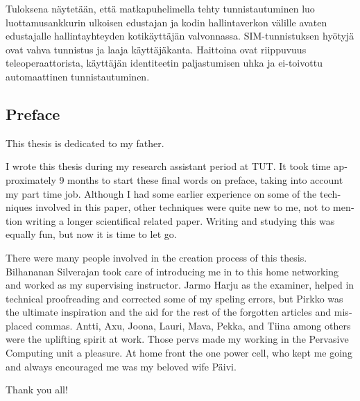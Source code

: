 \documentclass[12pt,a4paper,english]{tutthesis}
\begin{document}
\begin{otherlanguage}{finnish}
Tuloksena näytetään, että matkapuhelimella tehty tunnistautuminen luo 
luottamusankkurin ulkoisen edustajan ja kodin hallintaverkon välille avaten edustajalle hallintayhteyden kotikäyttäjän valvonnassa.
SIM-tunnistuksen hyötyjä ovat vahva tunnistus
 ja laaja  käyttäjäkanta. Haittoina ovat
 riippuvuus teleoperaattorista, käyttäjän identiteetin
paljastumisen uhka ja ei-toivottu automaattinen tunnistautuminen.
\end{otherlanguage}

\begin{otherlanguage}{english} %
\makeatother %

%
%
\chapter*{Preface}

This thesis is dedicated to my father. 


I wrote this thesis during my research assistant period at TUT.
It took time approximately 9 months to start these final words on preface,
taking into account my part time job.
Although I had some earlier experience on some of the techniques involved in this paper, 
other techniques were quite new to me, not to mention writing a longer
scientifical related paper. Writing and studying this was equally fun,
but now it is time to let go.

There were many people involved in the creation process of this thesis.
Bilhananan Silverajan took care of introducing me in to this 
home networking and worked as my supervising instructor. 
Jarmo Harju as the examiner, helped in technical proofreading and
corrected some of my speling errors, but Pirkko was the ultimate inspiration
and the aid for the rest of the forgotten articles and misplaced commas. 
Antti, Axu, Joona, Lauri, Mava, Pekka,  and Tiina among others were
the uplifting spirit at work. 
Those pervs made my working in the Pervasive Computing unit a pleasure.
At home front the one power cell, who kept me going and always encouraged me
was my beloved wife Päivi.

Thank you all!


\end{otherlanguage}
\end{document}

